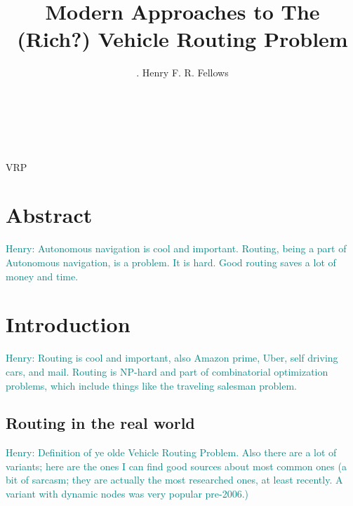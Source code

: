 \documentclass{sig-alternate}
\newcommand{\allcomments}[1]{{#1}}
\newcommand{\hfcomment}[1]{\textcolor{Teal}{\allcomments{Henry: {#1}}}}
\begin{document}

\title{Modern Approaches to The (Rich?) Vehicle Routing Problem}


\author{
.
\alignauthor
Henry F. R. Fellows\\
	\\
	\\
	\\
}

\maketitle
\begin{abstract}
\end{abstract}
VRP



\section{Abstract}
\label{sec:abstract}
\hfcomment{Autonomous navigation is cool and important. Routing, being a part of Autonomous navigation, is a problem. It is hard. Good routing saves a lot of money and time.}
\section{Introduction}
\label{sec:intro}
\hfcomment{Routing is cool and important, also Amazon prime, Uber, self driving cars, and mail. Routing is NP-hard and part of combinatorial optimization problems, which include things like the traveling salesman problem.}
\subsection{Routing in the real world}
\label{ssec:real}
\hfcomment{Definition of ye olde Vehicle Routing Problem. Also there are a lot of variants; here are the ones I can find good sources about most common ones (a bit of sarcasm; they are actually the most researched ones, at least recently. A variant with dynamic nodes was very popular pre-2006.)}
\end{document}
